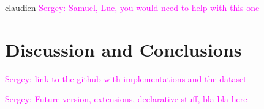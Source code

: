\documentclass{ecai}
\newcommand{\sergey}[1]{\textcolor{magenta}{{\sc Sergey:} #1}\xspace}
\begin{document}
claudien \cite{claudien} \sergey{Samuel, Luc, you would need to help with this one}

\section{Discussion and Conclusions}
\sergey{link to the github with implementations and the dataset}


\sergey{Future version, extensions, declarative stuff, bla-bla here}



\end{document}

